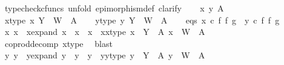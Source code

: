 \begin{isabellebody}
\ {\isacharparenleft}{\kern0pt}typecheck{\isacharunderscore}{\kern0pt}cfuncs{\isacharcomma}{\kern0pt}\ unfold\ epimorphism{\isacharunderscore}{\kern0pt}def{}{\isacharcomma}{\kern0pt}\ clarify{\isacharparenright}{\kern0pt}\isanewline
\ \ \isamarkupfalse%
\ x\ y\ A\isanewline
\ \ \isamarkupfalse%
\ x{\isacharunderscore}{\kern0pt}type{\isacharcolon}{\kern0pt}\ {\isachardoublequoteopen}x{\isacharcolon}{\kern0pt}\ Y\ {\isasymCoprod}\ W\ {\isasymrightarrow}\ A{\isachardoublequoteclose}\isanewline
\ \ \isamarkupfalse%
\ y{\isacharunderscore}{\kern0pt}type{\isacharcolon}{\kern0pt}\ {\isachardoublequoteopen}y{\isacharcolon}{\kern0pt}\ Y\ {\isasymCoprod}\ W\ {\isasymrightarrow}\ A{\isachardoublequoteclose}\isanewline
\ \ \isamarkupfalse%
\ eqs{\isacharcolon}{\kern0pt}\ {\isachardoublequoteopen}x\ {\isasymcirc}\isactrlsub c\ f\ {\isasymbowtie}\isactrlsub f\ g\ {\isacharequal}{\kern0pt}\ y\ {\isasymcirc}\isactrlsub c\ f\ {\isasymbowtie}\isactrlsub f\ g{\isachardoublequoteclose}\isanewline
\isanewline
\ \ \isamarkupfalse%
\ x{}\ x{}\ \ x{\isacharunderscore}{\kern0pt}expand{\isacharcolon}{\kern0pt}\ {\isachardoublequoteopen}x\ {\isacharequal}{\kern0pt}\ x{}\ {\isasymamalg}\ x{}{\isachardoublequoteclose}\ \ x{}{\isacharunderscore}{\kern0pt}x{}{\isacharunderscore}{\kern0pt}type{\isacharcolon}{\kern0pt}\ {\isachardoublequoteopen}x{}\ {\isacharcolon}{\kern0pt}\ Y\ {\isasymrightarrow}\ A{\isachardoublequoteclose}\ {\isachardoublequoteopen}x{}\ {\isacharcolon}{\kern0pt}\ W\ {\isasymrightarrow}\ A{\isachardoublequoteclose}\isanewline
\ \ \ \ \isamarkupfalse%
\ coprod{\isacharunderscore}{\kern0pt}decomp\ x{\isacharunderscore}{\kern0pt}type\ \isamarkupfalse%
\ blast\isanewline
\ \ \isamarkupfalse%
\ y{}\ y{}\ \ y{\isacharunderscore}{\kern0pt}expand{\isacharcolon}{\kern0pt}\ {\isachardoublequoteopen}y\ {\isacharequal}{\kern0pt}\ y{}\ {\isasymamalg}\ y{}{\isachardoublequoteclose}\ \ y{}{\isacharunderscore}{\kern0pt}y{}{\isacharunderscore}{\kern0pt}type{\isacharcolon}{\kern0pt}\ {\isachardoublequoteopen}y{}\ {\isacharcolon}{\kern0pt}\ Y\ {\isasymrightarrow}\ A{\isachardoublequoteclose}\ {\isachardoublequoteopen}y{}\ {\isacharcolon}{\kern0pt}\ W\ {\isasymrightarrow}\ A{\isachardoublequoteclose}\isanewline

\end{isabellebody}
